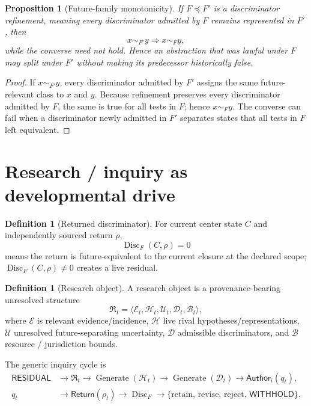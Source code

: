 \documentclass[10pt]{article}
\theoremstyle{venus}
\newtheorem{proposition}[theorem]{Proposition}
\theoremstyle{definition}
\newtheorem{definition}[theorem]{Definition}
\newcommand{\Disc}{\operatorname{Disc}}
\newcommand{\Generate}{\operatorname{Generate}}
\newcommand{\Return}{\mathsf{Return}}
\newcommand{\Author}{\mathsf{Author}}
\newcommand{\Withhold}{\mathsf{WITHHOLD}}
\newcommand{\ResidualState}{\mathsf{RESIDUAL}}
\begin{document}
\begin{proposition}[Future-family monotonicity]
If $F\preceq F'$ is a discriminator refinement, meaning every discriminator
admitted by $F$ remains represented in $F'$, then
\[
x\sim_{F'}y\Longrightarrow x\sim_Fy,
\]
while the converse need not hold. Hence an abstraction that was lawful under
$F$ may split under $F'$ without making its predecessor historically false.
\end{proposition}
\begin{proof}
If $x\sim_{F'}y$, every discriminator admitted by $F'$ assigns the same
future-relevant class to $x$ and $y$. Because refinement preserves every
discriminator admitted by $F$, the same is true for all tests in $F$; hence
$x\sim_Fy$. The converse can fail when a discriminator newly admitted in
$F'$ separates states that all tests in $F$ left equivalent.
\end{proof}

\section{Research / inquiry as developmental drive}

\begin{definition}[Returned discriminator]
For current center state $C$ and independently sourced return $\rho$,
\[
\Disc_F(C,\rho)=0
\]
means the return is future-equivalent to the current closure at the declared
scope; $\Disc_F(C,\rho)\neq0$ creates a live residual.
\end{definition}

\begin{definition}[Research object]
A research object is a provenance-bearing unresolved structure
\begin{equation}\label{eq:researchobject}
\mathfrak R_t
=
\langle
\mathcal E_t,\mathcal H_t,\mathcal U_t,\mathcal D_t,\mathcal B_t
\rangle,
\end{equation}
where $\mathcal E$ is relevant evidence/incidence, $\mathcal H$ live rival
hypotheses/representations, $\mathcal U$ unresolved future-separating
uncertainty, $\mathcal D$ admissible discriminators, and $\mathcal B$ resource /
jurisdiction bounds.
\end{definition}

The generic inquiry cycle is
\begin{equation}\label{eq:researchcycle}
\begin{aligned}
\ResidualState&\to\mathfrak R_t
\to\Generate(\mathcal H_t)
\to\Generate(\mathcal D_t)
\to\Author_i(q_t),\\
q_t&\to\Return(\rho_t)
\to\Disc_F
\to\{\text{retain, revise, reject, }\Withhold\}.
\end{aligned}
\end{equation}
\end{document}
